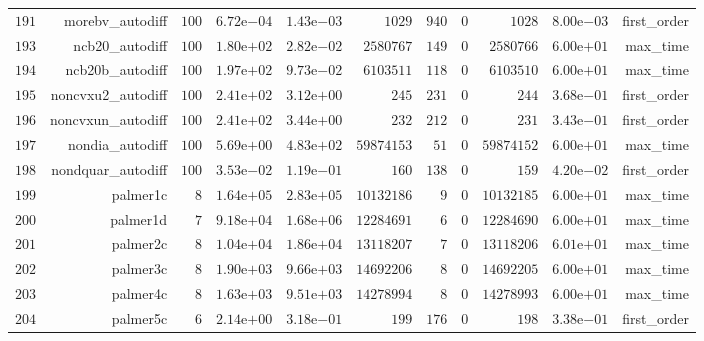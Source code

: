 \documentclass[varwidth=20cm,crop=true]{standalone}
\begin{document}
\begin{longtable}{rrrrrrrrrrr}
  \(   191\) & morebv\_autodiff & \(   100\) & \( 6.72\)e\(-04\) & \( 1.43\)e\(-03\) & \(  1029\) & \(   940\) & \(     0\) & \(  1028\) & \( 8.00\)e\(-03\) & first\_order \\
  \(   193\) & ncb20\_autodiff & \(   100\) & \( 1.80\)e\(+02\) & \( 2.82\)e\(-02\) & \(2580767\) & \(   149\) & \(     0\) & \(2580766\) & \( 6.00\)e\(+01\) & max\_time \\
  \(   194\) & ncb20b\_autodiff & \(   100\) & \( 1.97\)e\(+02\) & \( 9.73\)e\(-02\) & \(6103511\) & \(   118\) & \(     0\) & \(6103510\) & \( 6.00\)e\(+01\) & max\_time \\
  \(   195\) & noncvxu2\_autodiff & \(   100\) & \( 2.41\)e\(+02\) & \( 3.12\)e\(+00\) & \(   245\) & \(   231\) & \(     0\) & \(   244\) & \( 3.68\)e\(-01\) & first\_order \\
  \(   196\) & noncvxun\_autodiff & \(   100\) & \( 2.41\)e\(+02\) & \( 3.44\)e\(+00\) & \(   232\) & \(   212\) & \(     0\) & \(   231\) & \( 3.43\)e\(-01\) & first\_order \\
  \(   197\) & nondia\_autodiff & \(   100\) & \( 5.69\)e\(+00\) & \( 4.83\)e\(+02\) & \(59874153\) & \(    51\) & \(     0\) & \(59874152\) & \( 6.00\)e\(+01\) & max\_time \\
  \(   198\) & nondquar\_autodiff & \(   100\) & \( 3.53\)e\(-02\) & \( 1.19\)e\(-01\) & \(   160\) & \(   138\) & \(     0\) & \(   159\) & \( 4.20\)e\(-02\) & first\_order \\
  \(   199\) & palmer1c & \(     8\) & \( 1.64\)e\(+05\) & \( 2.83\)e\(+05\) & \(10132186\) & \(     9\) & \(     0\) & \(10132185\) & \( 6.00\)e\(+01\) & max\_time \\
  \(   200\) & palmer1d & \(     7\) & \( 9.18\)e\(+04\) & \( 1.68\)e\(+06\) & \(12284691\) & \(     6\) & \(     0\) & \(12284690\) & \( 6.00\)e\(+01\) & max\_time \\
  \(   201\) & palmer2c & \(     8\) & \( 1.04\)e\(+04\) & \( 1.86\)e\(+04\) & \(13118207\) & \(     7\) & \(     0\) & \(13118206\) & \( 6.01\)e\(+01\) & max\_time \\
  \(   202\) & palmer3c & \(     8\) & \( 1.90\)e\(+03\) & \( 9.66\)e\(+03\) & \(14692206\) & \(     8\) & \(     0\) & \(14692205\) & \( 6.00\)e\(+01\) & max\_time \\
  \(   203\) & palmer4c & \(     8\) & \( 1.63\)e\(+03\) & \( 9.51\)e\(+03\) & \(14278994\) & \(     8\) & \(     0\) & \(14278993\) & \( 6.00\)e\(+01\) & max\_time \\
  \(   204\) & palmer5c & \(     6\) & \( 2.14\)e\(+00\) & \( 3.18\)e\(-01\) & \(   199\) & \(   176\) & \(     0\) & \(   198\) & \( 3.38\)e\(-01\) & first\_order \\

\end{longtable}
\end{document}
